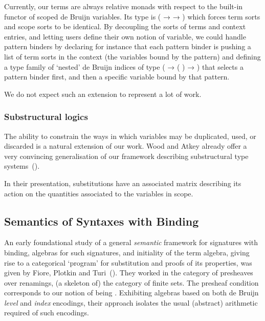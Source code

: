 Currently, our terms are always relative monads with respect to the built-in
 functor of scoped de Bruijn variables. Its type is
{( →   → )} which forces term sorts and
scope sorts to be identical.
%
By decoupling the sorts of terms and context entries, and letting users
define their own notion of variable, we could handle pattern binders by
declaring for instance that each pattern binder is pushing a list of
term sorts in the context (the variables bound by the pattern) and
defining a type family of `nested' de Bruijn indices of type
{( →  ( ) → )} that selects a
pattern binder first, and then a specific variable bound by that pattern.

We do not expect such an extension to represent a lot of work.

\subsubsection{Substructural logics}

The ability to constrain the ways in which variables may be duplicated, used,
or discarded is a natural extension of our work.
%
Wood and Atkey already offer a very convincing generalisation of our framework
describing substructural type systems~(\citeyear{DBLP:conf/esop/WoodA22}).

In their presentation, substitutions have an associated matrix describing its
action on the quantities associated to the variables in scope.


\subsection{Semantics of Syntaxes with Binding} An early foundational study
of a general \emph{semantic} framework for signatures with binding, algebras
for such signatures, and initiality of the term algebra, giving rise to a
categorical `program' for substitution and proofs of its properties, was given
by Fiore, Plotkin and Turi~(\citeyear{FiorePlotkinTuri99}).%
They worked in the category of presheaves
over renamings, (a skeleton of) the category of finite sets. The presheaf
condition corresponds to our notion of being . Exhibiting
algebras based on both de Bruijn \emph{level} and \emph{index} encodings,
their approach isolates the usual (abstract) arithmetic required of such
encodings.

